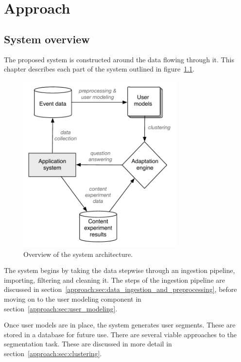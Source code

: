 \chapter{Approach}

\label{Chapter3}


\section{System overview} %
\label{approach:sec:system_overview}

The proposed system is constructed around the data flowing through it. This chapter describes each part of the system outlined in figure~\ref{fig:system-architecture}.

\begin{figure}[h]
  \centering
    \includegraphics[width=0.75\textwidth]{Figures/system-architecture}
    \caption{Overview of the system architecture.}
    \label{fig:system-architecture}
\end{figure}

The system begins by taking the data stepwise through an ingestion pipeline, importing, filtering and cleaning it. The steps of the ingestion pipeline are discussed in section~\ref{approach:sec:data_ingestion_and_preprocessing}, before moving on to the user modeling component in section~\ref{approach:sec:user_modeling}.

Once user models are in place, the system generates user segments. These are stored in a database for future use. There are several viable approaches to the segmentation task. These are discussed in more detail in section~\ref{approach:sec:clustering}.

